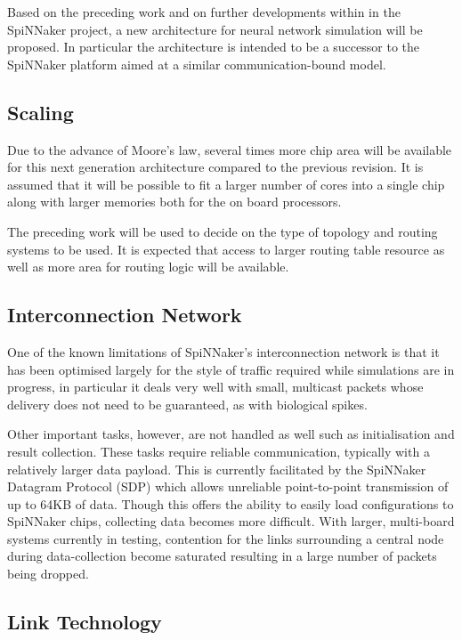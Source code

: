		Based on the preceding work and on further developments within in the
		SpiNNaker project, a new architecture for neural network simulation will be
		proposed. In particular the architecture is intended to be a successor to
		the SpiNNaker platform aimed at a similar communication-bound model.
		
		\subsection{Scaling}
			
			Due to the advance of Moore's law, several times more chip area will be
			available for this next generation architecture compared to the previous
			revision. It is assumed that it will be possible to fit a larger number of
			cores into a single chip along with larger memories both for the on board
			processors.
			
			The preceding work will be used to decide on the type of topology and
			routing systems to be used. It is expected that access to larger routing
			table resource as well as more area for routing logic will be available.
		
		\subsection{Interconnection Network}
			
			One of the known limitations of SpiNNaker's interconnection network is
			that it has been optimised largely for the style of traffic required while
			simulations are in progress, in particular it deals very well with small,
			multicast packets whose delivery does not need to be guaranteed, as with
			biological spikes.
			
			Other important tasks, however, are not handled as well such as
			initialisation and result collection. These tasks require reliable
			communication, typically with a relatively larger data payload. This is
			currently facilitated by the SpiNNaker Datagram Protocol (SDP)
			\cite{temple11} which allows unreliable point-to-point transmission of up
			to 64KB of data. Though this offers the ability to easily load
			configurations to SpiNNaker chips, collecting data becomes more difficult.
			With larger, multi-board systems currently in testing, contention for
			the links surrounding a central node during data-collection become
			saturated resulting in a large number of packets being dropped.
		
		\subsection{Link Technology}
			
